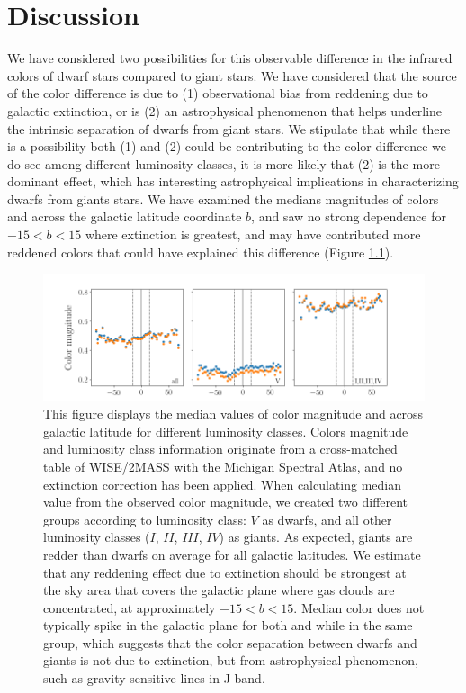 \chapter{Discussion}\label{chap:DISCUSSION}
We have considered two possibilities for this observable difference in the infrared colors of dwarf stars compared to giant stars. We have considered that the source of the color difference is due to (1) observational bias from reddening due to galactic extinction, or is (2) an astrophysical phenomenon that helps underline the intrinsic separation of dwarfs from giant stars. We stipulate that while there is a possibility both (1) and (2) could be contributing to the color difference we do see among different luminosity classes, it is more likely that (2) is the more dominant effect, which has interesting astrophysical implications in characterizing dwarfs from giants stars. We have examined the medians magnitudes of colors \jwone and \jwtwo across the galactic latitude coordinate $b$, and saw no strong dependence for $-15<b<15$ where extinction is greatest, and may have contributed more reddened colors that could have explained this difference (Figure \ref{fig:color-vs-b}).

\begin{figure}
    \centering
    \includegraphics[width=1.0\textwidth,clip=true]{Figures/populations/plot-b-vs-color.png}
    \caption{This figure displays the median values of color magnitude \jwone and \jwtwo across galactic latitude for different luminosity classes. Colors magnitude and luminosity class information originate from a cross-matched table of WISE/2MASS with the Michigan Spectral Atlas, and no extinction correction has been applied. When calculating median value from the observed color magnitude, we created two different groups according to luminosity class: $V$ as dwarfs, and all other luminosity classes ($I$, $II$, $III$, $IV$) as giants. As expected, giants are redder than dwarfs on average for all galactic latitudes. We estimate that any reddening effect due to extinction should be strongest at the sky area that covers the galactic plane where gas clouds are concentrated, at approximately $-15<b<15$. Median color does not typically spike in the galactic plane for both \jwone and \jwtwo while in the same group, which suggests that the color separation between dwarfs and giants is not due to extinction, but from astrophysical phenomenon, such as gravity-sensitive lines in J-band.}
    \label{fig:color-vs-b}
\end{figure}

